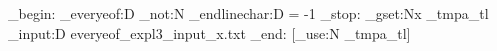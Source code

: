 \documentclass{article}
\begin{document}
\ExplSyntaxOn
\group_begin:
\tex_everyeof:D { \exp_not:N }
\tex_endlinechar:D = -1 \scan_stop:
\tl_gset:Nx \g_tmpa_tl { \tex_input:D { everyeof_expl3_input_x.txt } }
\group_end:
[\tl_use:N \g_tmpa_tl]
\ExplSyntaxOff
\end{document}
